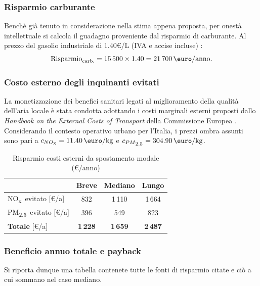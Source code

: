 \documentclass[conference]{IEEEtran}
\newcommand{\nox}{NO\textsubscript{x}}
\newcommand{\pmtwo}{PM\textsubscript{2.5}}
\begin{document}
\subsubsection{Risparmio carburante}
Benchè già tenuto in considerazione nella stima appena proposta, per onestà intellettuale si calcola il guadagno proveniente dal risparmio di carburante. Al prezzo del gasolio industriale di 1.40\euro{}/L (IVA e accise
incluse) \cite{mit_costi_gasolio}:
\begin{equation}
  \text{Risparmio}_\text{carb.} = 15\,500 \times 1.40
  = \SI{21\,700}{\euro}\text{/anno}.
  \label{eq:fuel_savings_eur}
\end{equation}

\subsubsection{Costo esterno degli inquinanti evitati}
La monetizzazione dei benefici sanitari legati al miglioramento della qualità dell'aria locale è stata condotta adottando i costi marginali esterni proposti dallo \textit{Handbook on the External Costs of Transport} della Commissione Europea \cite{ec_handbook2019}. Considerando il contesto operativo urbano per l'Italia, i prezzi ombra assunti sono pari a $c_{\nox} = 11.40\,\text{\euro}/\text{kg}$ e $c_{\pmtwo} = 304.90\,\text{\euro}/\text{kg}$.

\begin{table}[htbp]
\caption{Risparmio costi esterni da spostamento modale (\euro/anno)}
\label{tab:ext_costs}
\centering
\renewcommand{\arraystretch}{1.15}
\begin{tabular}{@{}lccc@{}}
\toprule
 & Breve & Mediano & Lungo \\
\midrule
\nox\ evitato [\euro/a]   & 832 & 1\,110 & 1\,664 \\
\pmtwo\ evitato [\euro/a] & 396 & 549 & 823 \\
\midrule
\textbf{Totale} [\euro/a] & \textbf{1\,228} & \textbf{1\,659} & \textbf{2\,487} \\
\bottomrule
\end{tabular}
\end{table}

\subsubsection{Beneficio annuo totale e payback}
Si riporta dunque una tabella contenete tutte le fonti di risparmio citate e ciò a cui sommano nel caso mediano.
\end{document}
